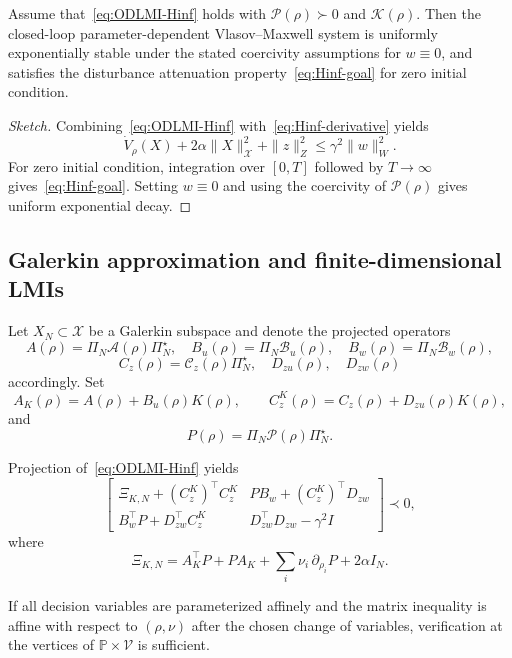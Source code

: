 \documentclass[AMA,Times2COL]{WileyNJDv5}
\begin{document}
\begin{theorem}\label{thm:Hinf}
Assume that~\eqref{eq:ODLMI-Hinf} holds with $\mathcal{P}(\rho)\succ0$ and $\mathcal{K}(\rho)$. Then the closed-loop parameter-dependent Vlasov--Maxwell system is uniformly exponentially stable under the stated
coercivity assumptions for $w\equiv0$, and satisfies the disturbance attenuation property~\eqref{eq:Hinf-goal} for zero initial condition.
\end{theorem}

\begin{proof}[Sketch]
Combining~\eqref{eq:ODLMI-Hinf} with~\eqref{eq:Hinf-derivative} yields
\[
\dot V_\rho(X)+2\alpha\|X\|_{\mathscr X}^{2}+\|z\|_{Z}^{2}
\le
\gamma^{2}\|w\|_{W}^{2}.
\]
For zero initial condition, integration over $[0,T]$ followed by $T\to\infty$ gives~\eqref{eq:Hinf-goal}. Setting $w\equiv0$ and using the coercivity of
$\mathcal{P}(\rho)$ gives uniform exponential decay.
\end{proof}

\subsection{Galerkin approximation and finite-dimensional LMIs}

Let $X_N\subset\mathscr{X}$ be a Galerkin subspace and denote the projected operators
\[
A(\rho)=\Pi_N\mathcal{A}(\rho)\Pi_N^{\star},\quad
B_u(\rho)=\Pi_N\mathcal{B}_u(\rho),\quad
B_w(\rho)=\Pi_N\mathcal{B}_w(\rho),
\]
\[
C_z(\rho)=\mathcal{C}_z(\rho)\Pi_N^\star,\quad
D_{zu}(\rho),\quad D_{zw}(\rho)
\]
accordingly. Set
\[
A_K(\rho)=A(\rho)+B_u(\rho)K(\rho),\qquad
C_z^K(\rho)=C_z(\rho)+D_{zu}(\rho)K(\rho),
\]
and
\[
P(\rho)=\Pi_N\mathcal{P}(\rho)\Pi_N^{\star}.
\]

Projection of~\eqref{eq:ODLMI-Hinf} yields
\begin{equation}\label{eq:LMI-Hinf-matrix}
\begin{bmatrix}
\Xi_{K,N}+(C_z^K)^{\top}C_z^K
&
P B_w+(C_z^K)^{\top}D_{zw}
\\[0.3em]
B_w^{\top}P+D_{zw}^{\top}C_z^K
&
D_{zw}^{\top}D_{zw}-\gamma^{2}I
\end{bmatrix}
\prec 0,
\end{equation}
where
\[
\Xi_{K,N}
=
A_K^{\top}P
+
P A_K
+
\sum_i\nu_i\,\partial_{\rho_i}P
+
2\alpha I_N .
\]

If all decision variables are parameterized affinely and the matrix inequality is affine with respect to $(\rho,\nu)$ after the chosen change of variables, verification at the vertices of $\mathbb{P}\times\mathcal{V}$ is sufficient.
\end{document}
